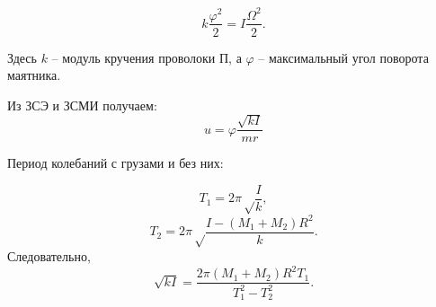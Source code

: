 \[k\frac{\varphi^2}{2} = I\frac{\Omega^2}{2}.\]

Здесь $k$ -- модуль кручения проволоки П, а $\varphi$ --
максимальный угол поворота маятника.

Из ЗСЭ и ЗСМИ получаем:
\[u = \varphi\frac{\sqrt{kI}}{mr}\]

Период колебаний с грузами и без них:

\[T_1 = 2\pi\sqrt\frac Ik,\]
\[T_2 = 2\pi\sqrt\frac{I - \left(M_1+M_2\right)R^2}{k}.\]
Следовательно,
\[\sqrt{kI} = \frac{2\pi\left(M_1+M_2\right)R^2T_1}{T_{1}^2 - T^{2}_2}.\]
